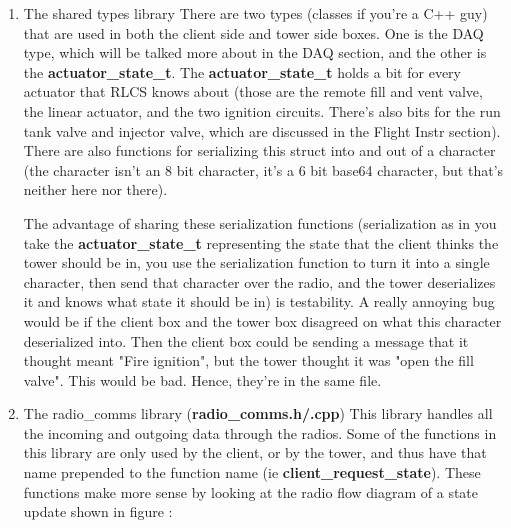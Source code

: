 \documentclass[11pt]{article}
\begin{document}
\begin{enumerate}
\item The shared types library
\label{sec:org27dd200}
There are two types (classes if you're a C++ guy) that are used in both the
client side and tower side boxes. One is the DAQ type, which will be talked more
about in the DAQ section, and the other is the \textbf{actuator\_state\_t}. The
\textbf{actuator\_state\_t} holds a bit for every actuator that RLCS knows about (those
are the remote fill and vent valve, the linear actuator, and the two ignition
circuits. There's also bits for the run tank valve and injector valve, which are
discussed in the Flight Instr section). There are also functions for serializing
this struct into and out of a character (the character isn't an 8 bit character,
it's a 6 bit base64 character, but that's neither here nor there).

The advantage of sharing these serialization functions (serialization as in you
take the \textbf{actuator\_state\_t} representing the state that the client thinks the
tower should be in, you use the serialization function to turn it into a single
character, then send that character over the radio, and the tower deserializes
it and knows what state it should be in) is testability. A really annoying bug
would be if the client box and the tower box disagreed on what this character
deserialized into. Then the client box could be sending a message that it
thought meant "Fire ignition", but the tower thought it was "open the fill
valve". This would be bad. Hence, they're in the same file.

\item The radio\_comms library (\textbf{radio\_comms.h/.cpp})
\label{sec:org9d34d46}
This library handles all the incoming and outgoing data through the
radios. Some of the functions in this library are only used by the client, or by
the tower, and thus have that name prepended to the function name (ie
\textbf{client\_request\_state}). These functions make more sense by looking at the radio
flow diagram of a state update shown in figure :


\end{enumerate}
\end{document}
